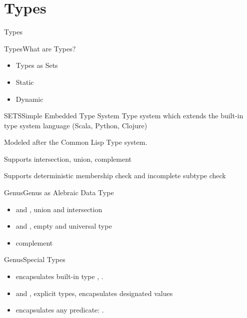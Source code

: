 \section{Types}
\begin{frame}{Types}
  
\end{frame}

\begin{frame}{Types}{What are Types?}
  \begin{itemize}
  \item Types as Sets
  \item Static
  \item Dynamic
  \end{itemize}
\end{frame}

\begin{frame}{SETS}{Simple Embedded Type System}
  Type system which extends the built-in type system language (Scala, Python, Clojure)

  Modeled after the Common Lisp Type system.

  Supports intersection, union, complement

  Supports deterministic membership check and incomplete subtype check

\end{frame}

\begin{frame}{Genus}{Genus as Alebraic Data Type}
  \begin{itemize}
  \item {} and , union and intersection
  \item {} and , empty and universal type
  \item {} complement
  \end{itemize}
\end{frame}

\begin{frame}{Genus}{Special Types}
  \begin{itemize}
  \item {} encapsulates built-in type  \eg, .
  \item {} and , explicit types, encapsulates designated values
  \item {} encapsulates any predicate: .
  \end{itemize}
\end{frame}


